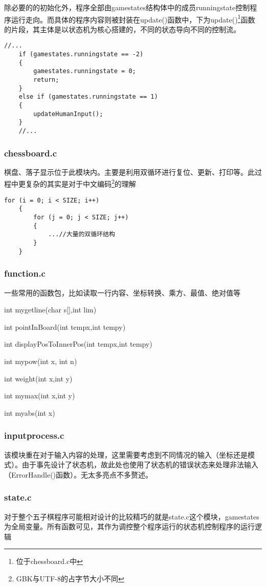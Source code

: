 	除必要的的初始化外，程序全部由gamestates结构体中的成员runningstate控制程序运行走向。而具体的程序内容则被封装在update()函数中，下为update()\footnote{位于chessboard.c中}函数的片段，其主体是以状态机为核心搭建的，不同的状态导向不同的控制流。
	\begin{lstlisting}[style=c]
	//...
	if (gamestates.runningstate == -2)
	{
		gamestates.runningstate = 0;
		return;
	}
	else if (gamestates.runningstate == 1)
	{
		updateHumanInput();
	}
	//...
	\end{lstlisting}
	\subsubsection{chessboard.c}
	棋盘、落子显示位于此模块内。主要是利用双循环进行复位、更新、打印等。此过程中更复杂的其实是对于中文编码\footnote{GBK与UTF-8的占字节大小不同}的理解
	\begin{lstlisting}[style=c]
	for (i = 0; i < SIZE; i++)
	{
		for (j = 0; j < SIZE; j++)
		{
			...//大量的双循环结构
		}
	}
	\end{lstlisting}
	\subsubsection{function.c}
	一些常用的函数包，比如读取一行内容、坐标转换、乘方、最值、绝对值等
	\begin{compactitem}
		\item int mygetline(char s[],int lim)
		\item int pointInBoard(int tempx,int tempy)
		\item int displayPosToInnerPos(int tempx,int tempy)
		\item int mypow(int x, int n)
		\item int weight(int x,int y)
		\item int mymax(int x,int y)
		\item int myabs(int x)
	\end{compactitem}
	\subsubsection{inputprocess.c}
	该模块重在对于输入内容的处理，这里需要考虑到不同情况的输入（坐标还是模式）。由于事先设计了状态机，故此处也使用了状态机的错误状态来处理非法输入（ErrorHandle()函数）。无太多亮点不多赘述。
	\subsubsection{state.c}
	对于整个五子棋程序可能相对设计的比较精巧的就是state.c这个模块，gamestates为全局变量。所有函数可见，其作为调控整个程序运行的状态机控制程序的运行逻辑
	\begin{compactitem}
		\item 
		\item 
		\item 
		
	\end{compactitem}
	



